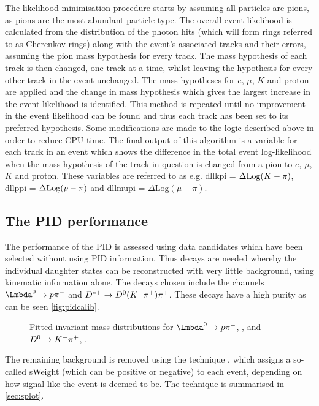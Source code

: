 
The likelihood minimisation procedure starts by assuming all particles are pions, as pions are the most abundant particle type. The overall event likelihood is calculated from the distribution of the photon hits (which will form rings referred to as Cherenkov rings) along with the event's associated tracks and their errors, assuming the pion mass hypothesis for every track. The mass hypothesis of each track is then changed, one track at a time, whilst leaving the hypothesis for every other track in the event unchanged. The mass hypotheses for $e$, $\mu$, $K$ and proton are applied and the change in mass hypothesis which gives the largest increase in the event likelihood is identified. This method is repeated until no improvement in the event likelihood can be found and thus each track has been set to its preferred hypothesis. Some modifications are made to the logic described above in order to reduce CPU time. The final output of this algorithm is a variable for each track in an event which shows the difference in the total event log-likelihood when the mass hypothesis of the track in question is changed from a pion to $e$, $\mu$, $K$ and proton. These variables are referred to as e.g. \gls{dllkpi}  = $\Delta \text{Log}({K} - \pi)$, \gls{dllppi} = $\Delta \text{Log}({p} - \pi)$ and \gls{dllmupi} = $\Delta \text{Log}(\mu - \pi)$. %
\subsection{The PID performance}
\label{sec:pidperf}

The performance of the PID is assessed using data candidates which have been selected without using PID information. Thus decays are needed whereby the individual daughter states can be reconstructed with very little background, using kinematic information alone. The decays chosen include the channels $\PLambda^{0}\to\proton\pim$ and $D^{*+} \rightarrow D^{0}({K}^{-}{{\pi}^+}){{\pi}^+}$. These decays have a high purity as can be seen \autoref{fig:pidcalib}.
\begin{figure}[h!]
  \centering
  \caption{Fitted invariant mass distributions for $\PLambda^{0}\to\proton\pim$, \protect{}, and $D^{0}\rightarrow {\ensuremath{K}}^{-}{{\pi}^+}$, \protect{} \cite{LHCb-DP-2012-003}.}
  \label{fig:pidcalib}
\end{figure}
The remaining background is removed using the \sPlot technique \cite{sPlot}, which assigns a so-called sWeight (which can be positive or negative) to each event, depending on how signal-like the event is deemed to be.  The \sPlot technique is summarised in \autoref{sec:splot}.

